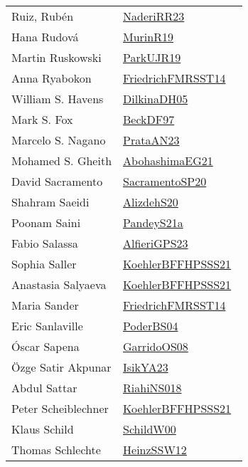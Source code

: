 {\begin{longtable}{p{4cm}p{20cm}}
Ruiz, Rub\'{e}n & \href{works/NaderiRR23.pdf}{NaderiRR23}~\cite{NaderiRR23}\\
Hana Rudov{\'{a}} & \href{works/MurinR19.pdf}{MurinR19}~\cite{MurinR19}\\
Martin Ruskowski & \href{works/ParkUJR19.pdf}{ParkUJR19}~\cite{ParkUJR19}\\
Anna Ryabokon & \href{}{FriedrichFMRSST14}~\cite{FriedrichFMRSST14}\\
William S. Havens & \href{works/DilkinaDH05.pdf}{DilkinaDH05}~\cite{DilkinaDH05}\\
Mark S. Fox & \href{works/BeckDF97.pdf}{BeckDF97}~\cite{BeckDF97}\\
Marcelo S. Nagano & \href{works/PrataAN23.pdf}{PrataAN23}~\cite{PrataAN23}\\
Mohamed S. Gheith & \href{works/AbohashimaEG21.pdf}{AbohashimaEG21}~\cite{AbohashimaEG21}\\
David Sacramento & \href{works/SacramentoSP20.pdf}{SacramentoSP20}~\cite{SacramentoSP20}\\
Shahram Saeidi & \href{}{AlizdehS20}~\cite{AlizdehS20}\\
Poonam Saini & \href{works/PandeyS21a.pdf}{PandeyS21a}~\cite{PandeyS21a}\\
Fabio Salassa & \href{works/AlfieriGPS23.pdf}{AlfieriGPS23}~\cite{AlfieriGPS23}\\
Sophia Saller & \href{works/KoehlerBFFHPSSS21.pdf}{KoehlerBFFHPSSS21}~\cite{KoehlerBFFHPSSS21}\\
Anastasia Salyaeva & \href{works/KoehlerBFFHPSSS21.pdf}{KoehlerBFFHPSSS21}~\cite{KoehlerBFFHPSSS21}\\
Maria Sander & \href{}{FriedrichFMRSST14}~\cite{FriedrichFMRSST14}\\
Eric Sanlaville & \href{works/PoderBS04.pdf}{PoderBS04}~\cite{PoderBS04}\\
{\'{O}}scar Sapena & \href{works/GarridoOS08.pdf}{GarridoOS08}~\cite{GarridoOS08}\\
{\"{O}}zge Satir Akpunar & \href{works/IsikYA23.pdf}{IsikYA23}~\cite{IsikYA23}\\
Abdul Sattar & \href{works/RiahiNS018.pdf}{RiahiNS018}~\cite{RiahiNS018}\\
Peter Scheiblechner & \href{works/KoehlerBFFHPSSS21.pdf}{KoehlerBFFHPSSS21}~\cite{KoehlerBFFHPSSS21}\\
Klaus Schild & \href{works/SchildW00.pdf}{SchildW00}~\cite{SchildW00}\\
Thomas Schlechte & \href{works/HeinzSSW12.pdf}{HeinzSSW12}~\cite{HeinzSSW12}\\

\end{longtable}}
